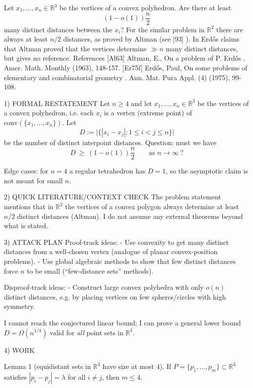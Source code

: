 
Let $x_1,\ldots,x_n\in \mathbb{R}^3$ be the vertices of a convex polyhedron. Are there at least\[(1-o(1))\frac{n}{2}\]many distinct distances between the $x_i$? For the similar problem in $\mathbb{R}^2$ there are always at least $n/2$ distances, as proved by Altman \cite{Al63} (see [93] ). In \cite{Er75f} Erd\H{o}s claims that Altman proved that the vertices determine $\gg n$ many distinct distances, but gives no reference. References [Al63] Altman, E., On a problem of P. Erd\H{o}s . Amer. Math. Monthly (1963), 148-157. [Er75f] Erd\H{o}s, Paul, On some problems of elementary and combinatorial geometry . Ann. Mat. Pura Appl. (4) (1975), 99-108.


1) FORMAL RESTATEMENT
Let $n\ge 4$ and let $x_1,\ldots,x_n\in\mathbb{R}^3$ be the vertices of a convex polyhedron,
i.e. each $x_i$ is a vertex (extreme point) of $\mathrm{conv}(\{x_1,\ldots,x_n\})$.
Let
\[
D:=\bigl|\bigl\{|x_i-x_j|:1\le i<j\le n\bigr\}\bigr|
\]
be the number of distinct interpoint distances. Question: must we have
\[
D\ \ge\ (1-o(1))\frac{n}{2}\qquad\text{as }n\to\infty\ ?
\]

Edge cases: for $n=4$ a regular tetrahedron has $D=1$, so the asymptotic claim is not meant for small $n$.

2) QUICK LITERATURE/CONTEXT CHECK
The problem statement mentions that in $\mathbb{R}^2$ the vertices of a convex polygon always determine
at least $n/2$ distinct distances (Altman). I do not assume any external theorems beyond what is stated.

3) ATTACK PLAN
Proof-track ideas:
- Use convexity to get many distinct distances from a well-chosen vertex (analogue of planar convex-position problems).
- Use global algebraic methods to show that few distinct distances force $n$ to be small (``few-distance sets'' methods).

Disproof-track ideas:
- Construct large convex polyhedra with only $o(n)$ distinct distances, e.g. by placing vertices on few spheres/circles with high symmetry.

I cannot reach the conjectured linear bound; I can prove a general lower bound $D=\Omega(n^{1/3})$ valid for \emph{all} point sets in $\mathbb{R}^3$.

4) WORK

Lemma 1 (equidistant sets in $\mathbb{R}^3$ have size at most $4$).
If $P=\{p_1,\ldots,p_m\}\subset\mathbb{R}^3$ satisfies $|p_i-p_j|=\lambda$ for all $i\neq j$, then $m\le 4$.

